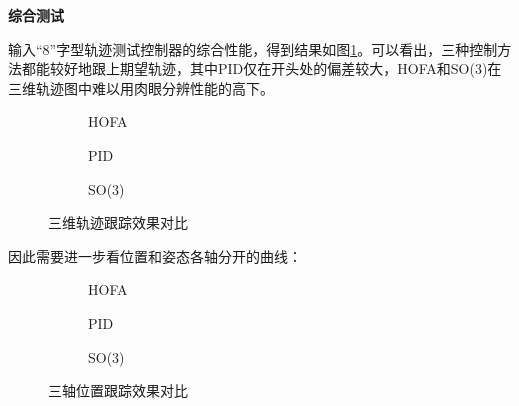 \textbf{综合测试}


  输入“8”字型轨迹测试控制器的综合性能，得到结果如图\ref{matlab_3d}。可以看出，三种控制方法都能较好地跟上期望轨迹，其中PID仅在开头处的偏差较大，HOFA和SO(3)在三维轨迹图中难以用肉眼分辨性能的高下。

  \newpage
  
  \begin{figure}[h]
      \centering
      \begin{subfigure}[t]{0.33\textwidth}
        \centering
        \caption{HOFA}
      \end{subfigure}\hfill
      \begin{subfigure}[t]{0.33\textwidth}
        \centering
        \caption{PID}
      \end{subfigure}\hfill
      \begin{subfigure}[t]{0.33\textwidth}
        \centering
        \caption{SO(3)}
      \end{subfigure}
      \caption{三维轨迹跟踪效果对比}
      \label{matlab_3d}
  \end{figure}
 
  因此需要进一步看位置和姿态各轴分开的曲线：

  \begin{figure}[h]
    \centering
    \begin{subfigure}[t]{0.33\textwidth}
      \centering
      \caption{HOFA}
    \end{subfigure}\hfill
    \begin{subfigure}[t]{0.33\textwidth}
      \centering
      \caption{PID}
    \end{subfigure}\hfill
    \begin{subfigure}[t]{0.33\textwidth}
      \centering
      \caption{SO(3)}
    \end{subfigure}
    \caption{三轴位置跟踪效果对比}
    \label{matlab_x}
\end{figure}

